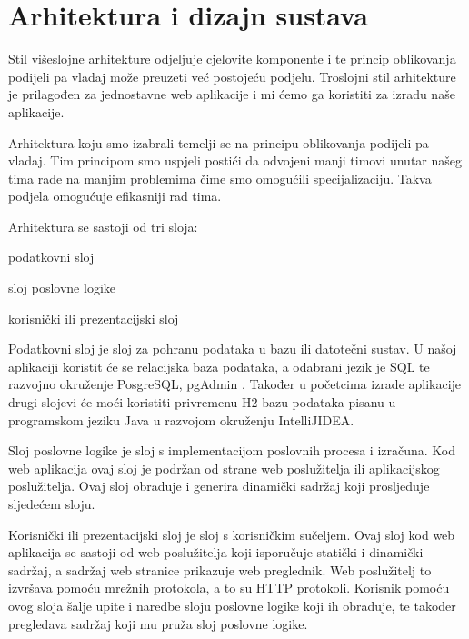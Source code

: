 \chapter{Arhitektura i dizajn sustava}
		

		 Stil višeslojne arhitekture odjeljuje cjelovite komponente i te princip oblikovanja podijeli pa vladaj može preuzeti već postojeću podjelu. Troslojni stil arhitekture je prilagođen za jednostavne web aplikacije i mi ćemo ga koristiti za izradu naše aplikacije.
		 
		Arhitektura koju smo izabrali temelji se na principu oblikovanja podijeli pa vladaj. Tim principom smo uspjeli postići da odvojeni manji timovi unutar našeg tima rade na manjim problemima čime smo omogućili specijalizaciju. Takva podjela omogućuje efikasniji rad tima.
		
		\vspace{5mm}
		\noindent Arhitektura se sastoji od tri sloja:
		\begin{packed_enum}
			\item  podatkovni sloj
		
			\item  sloj poslovne logike
		
			\item  korisnički ili prezentacijski sloj
		\end{packed_enum}
	
	Podatkovni sloj je sloj za pohranu podataka u bazu ili datotečni sustav. U našoj aplikaciji koristit će se relacijska baza podataka, a odabrani jezik je SQL te razvojno okruženje PosgreSQL, pgAdmin . Također u početcima izrade aplikacije drugi slojevi će moći koristiti privremenu H2 bazu podataka pisanu u programskom jeziku Java u razvojom okruženju IntelliJIDEA.
	
	Sloj poslovne logike je sloj s implementacijom poslovnih procesa i izračuna. Kod web aplikacija ovaj sloj je podržan od strane web poslužitelja ili aplikacijskog poslužitelja. Ovaj sloj obrađuje i generira dinamički sadržaj koji prosljeđuje sljedećem sloju.
	
	Korisnički ili prezentacijski sloj je sloj s korisničkim sučeljem. Ovaj sloj kod web aplikacija se sastoji od web poslužitelja koji isporučuje statički i dinamički sadržaj, a sadržaj web stranice prikazuje web preglednik. Web poslužitelj to izvršava pomoću mrežnih protokola, a to su HTTP protokoli. Korisnik pomoću ovog sloja šalje upite i naredbe sloju poslovne logike koji ih obrađuje, te također pregledava sadržaj koji mu pruža sloj poslovne logike.


